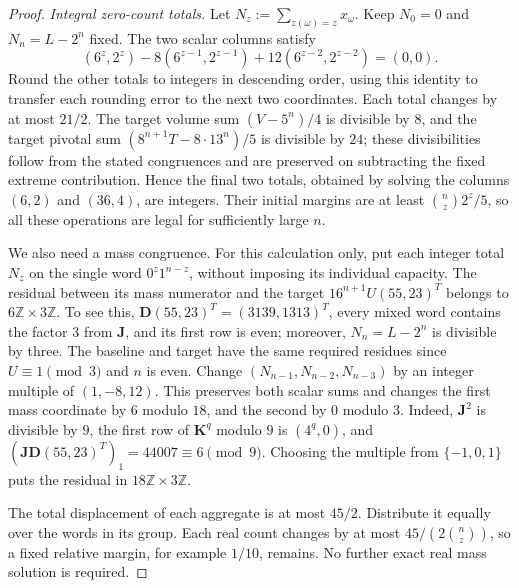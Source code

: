 \begin{proof}
\emph{Integral zero-count totals.}
Let $N_z:=\sum_{z(\omega)=z}x_\omega$. Keep $N_0=0$ and $N_n=L-2^n$ fixed. The two scalar columns satisfy
\[
 (6^z,2^z)-8(6^{z-1},2^{z-1})+12(6^{z-2},2^{z-2})=(0,0).
\]
Round the other totals to integers in descending order, using this identity to transfer each rounding error to the next two coordinates. Each total changes by at most $21/2$. The target volume sum $(V-5^n)/4$ is divisible by $8$, and the target pivotal sum $(8^{n+1}T-8\cdot13^n)/5$ is divisible by $24$; these divisibilities follow from the stated congruences and are preserved on subtracting the fixed extreme contribution. Hence the final two totals, obtained by solving the columns $(6,2)$ and $(36,4)$, are integers. Their initial margins are at least $\binom nz2^z/5$, so all these operations are legal for sufficiently large $n$.

We also need a mass congruence. For this calculation only, put each integer total $N_z$ on the single word $0^z1^{n-z}$, without imposing its individual capacity. The residual between its mass numerator and the target
$16^{n+1}U(55,23)^T$ belongs to $6\mathbb Z\times3\mathbb Z$. To see this, $\mathbf D(55,23)^T=(3139,1313)^T$, every mixed word contains the factor $3$ from $\mathbf J$, and its first row is even; moreover, $N_n=L-2^n$ is divisible by three. The baseline and target have the same required residues since $U\equiv1\pmod3$ and $n$ is even.
Change $(N_{n-1},N_{n-2},N_{n-3})$ by an integer multiple of $(1,-8,12)$. This preserves both scalar sums and changes the first mass coordinate by $6$ modulo $18$, and the second by $0$ modulo $3$. Indeed, $\mathbf J^2$ is divisible by $9$, the first row of $\mathbf K^q$ modulo $9$ is $(4^q,0)$, and $(\mathbf J\mathbf D(55,23)^T)_1=44007\equiv6\pmod9$. Choosing the multiple from $\{-1,0,1\}$ puts the residual in $18\mathbb Z\times3\mathbb Z$.

The total displacement of each aggregate is at most $45/2$. Distribute it equally over the words in its group. Each real count changes by at most $45/(2\binom nz)$, so a fixed relative margin, for example $1/10$, remains. No further exact real mass solution is required.


\end{proof}
